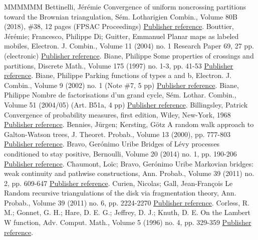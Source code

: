 \documentclass[11pt]{article}
\theoremstyle{definition}
\numberwithin{equation}{section}
\numberwithin{figure}{section}
\numberwithin{table}{section}
\begin{document}
\begin{thebibliography}{MMMMMM}
 Bettinelli, Jérémie Convergence of uniform noncrossing partitions toward the Brownian triangulation, Sém. Lotharigien Combin., Volume 80B (2018), \#38, 12 pages (FPSAC Proceedings) \href{https://ahl.centre-mersenne.org/item/AHL_2018__1__149_0/#Bet17}{Publisher reference}.
 Bouttier, Jérémie; Francesco, Philippe Di; Guitter, Emmanuel Planar maps as labeled mobiles, Electron. J. Combin., Volume 11 (2004) no. 1 Research Paper 69, 27 pp. (electronic) \href{https://ahl.centre-mersenne.org/item/AHL_2018__1__149_0/#BDFG04}{Publisher reference}.
 Biane, Philippe Some properties of crossings and partitions, Discrete Math., Volume 175 (1997) no. 1-3, pp. 41-53 \href{https://ahl.centre-mersenne.org/item/AHL_2018__1__149_0/#Biane1997}{Publisher reference}.
 Biane, Philippe Parking functions of types a and b, Electron. J. Combin., Volume 9 (2002) no. 1 (Note \#7, 5 pp) \href{https://ahl.centre-mersenne.org/item/AHL_2018__1__149_0/#Biane2002}{Publisher reference}.
 Biane, Philippe Nombre de factorisations d’un grand cycle, Sém. Lothar. Combin., Volume 51 (2004/05) (Art. B51a, 4 pp) \href{https://ahl.centre-mersenne.org/item/AHL_2018__1__149_0/#Biane2004}{Publisher reference}.
 Billingsley, Patrick Convergence of probability measures, first edition, Wiley, New-York, 1968 \href{https://ahl.centre-mersenne.org/item/AHL_2018__1__149_0/#Bil68}{Publisher reference}.
 Bennies, Jürgen; Kersting, Götz A random walk approach to Galton-Watson trees, J. Theoret. Probab., Volume 13 (2000), pp. 777-803 \href{https://ahl.centre-mersenne.org/item/AHL_2018__1__149_0/#BK00}{Publisher reference}.
 Bravo, Gerónimo Uribe Bridges of Lévy processes conditioned to stay positive, Bernoulli, Volume 20 (2014) no. 1, pp. 190-206 \href{https://ahl.centre-mersenne.org/item/AHL_2018__1__149_0/#UB14}{Publisher reference}.
 Chaumont, Loïc; Bravo, Gerónimo Uribe Markovian bridges: weak continuity and pathwise constructions, Ann. Probab., Volume 39 (2011) no. 2, pp. 609-647 \href{https://ahl.centre-mersenne.org/item/AHL_2018__1__149_0/#CUB11}{Publisher reference}.
 Curien, Nicolas; Gall, Jean-François Le Random recursive triangulations of the disk via fragmentation theory, Ann. Probab., Volume 39 (2011) no. 6, pp. 2224-2270 \href{https://ahl.centre-mersenne.org/item/AHL_2018__1__149_0/#CLGrecursive}{Publisher reference}.
 Corless, R. M.; Gonnet, G. H.; Hare, D. E. G.; Jeffrey, D. J.; Knuth, D. E. On the Lambert W function, Adv. Comput. Math., Volume 5 (1996) no. 4, pp. 329-359 \href{https://ahl.centre-mersenne.org/item/AHL_2018__1__149_0/#CGHJK96}{Publisher reference}.

\end{thebibliography}
\end{document}
